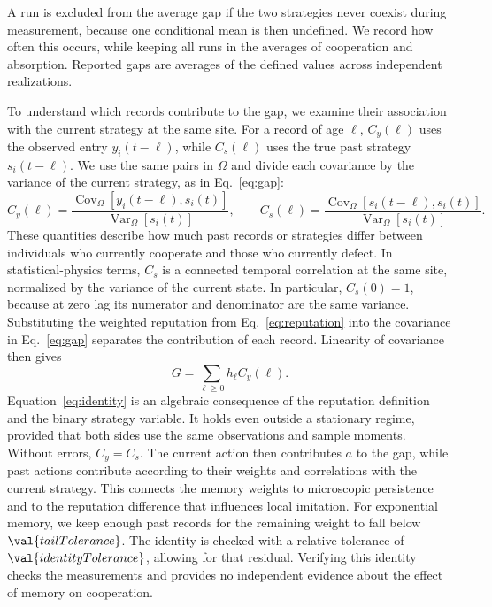 \documentclass[physics,article,submit,moreauthors]{Definitions/mdpi}
\begin{document}
A run is excluded from the average gap if the two strategies never coexist during measurement, because one conditional mean is then undefined. We record how often this occurs, while keeping all runs in the averages of cooperation and absorption. Reported gaps are averages of the defined values across independent realizations.

To understand which records contribute to the gap, we examine their association with the current strategy at the same site. For a record of age $\ell$, $C_y(\ell)$ uses the observed entry $y_i(t-\ell)$, while $C_s(\ell)$ uses the true past strategy $s_i(t-\ell)$. We use the same pairs in $\Omega$ and divide each covariance by the variance of the current strategy, as in Eq.~\eqref{eq:gap}:
\begin{equation}
 C_y(\ell)=\frac{\operatorname{Cov}_\Omega[y_i(t-\ell),s_i(t)]}
                   {\operatorname{Var}_\Omega[s_i(t)]},\qquad
 C_s(\ell)=\frac{\operatorname{Cov}_\Omega[s_i(t-\ell),s_i(t)]}
                   {\operatorname{Var}_\Omega[s_i(t)]}.
 \label{eq:correlations}
\end{equation}
These quantities describe how much past records or strategies differ between individuals who currently cooperate and those who currently defect. In statistical-physics terms, $C_s$ is a connected temporal correlation at the same site, normalized by the variance of the current state. In particular, $C_s(0)=1$, because at zero lag its numerator and denominator are the same variance. Substituting the weighted reputation from Eq.~\eqref{eq:reputation} into the covariance in Eq.~\eqref{eq:gap} separates the contribution of each record. Linearity of covariance then gives
\begin{equation}
 G=\sum_{\ell\geq0}h_\ell C_y(\ell).
 \label{eq:identity}
\end{equation}
Equation~\eqref{eq:identity} is an algebraic consequence of the reputation definition and the binary strategy variable. It holds even outside a stationary regime, provided that both sides use the same observations and sample moments. Without errors, $C_y=C_s$. The current action then contributes $a$ to the gap, while past actions contribute according to their weights and correlations with the current strategy. This connects the memory weights to microscopic persistence and to the reputation difference that influences local imitation. For exponential memory, we keep enough past records for the remaining weight to fall below $\val{tailTolerance}$. The identity is checked with a relative tolerance of $\val{identityTolerance}$, allowing for that residual. Verifying this identity checks the measurements and provides no independent evidence about the effect of memory on cooperation.
\end{document}
